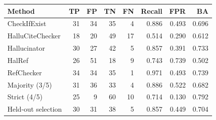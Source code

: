 \begin{tabular}{@{}lrrrrrrr@{}}\toprule
Method & TP & FP & TN & FN & Recall & FPR & BA \\
\midrule
CheckIfExist & 31 & 34 & 35 & 4 & 0.886 & 0.493 & 0.696 \\
HalluCiteChecker & 18 & 20 & 49 & 17 & 0.514 & 0.290 & 0.612 \\
Hallucinator & 30 & 27 & 42 & 5 & 0.857 & 0.391 & 0.733 \\
HalRef & 26 & 51 & 18 & 9 & 0.743 & 0.739 & 0.502 \\
RefChecker & 34 & 34 & 35 & 1 & 0.971 & 0.493 & 0.739 \\
Majority (3/5) & 31 & 36 & 33 & 4 & 0.886 & 0.522 & 0.682 \\
Strict (4/5) & 25 & 9 & 60 & 10 & 0.714 & 0.130 & 0.792 \\
Held-out selection & 30 & 31 & 38 & 5 & 0.857 & 0.449 & 0.704 \\
\bottomrule\end{tabular}
